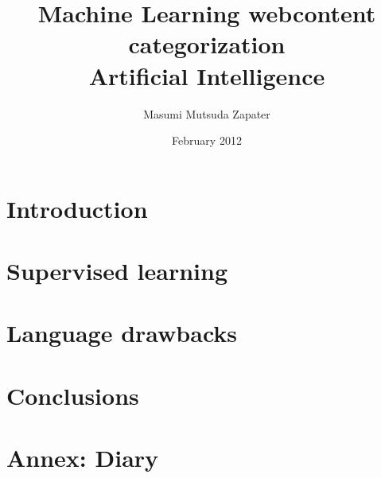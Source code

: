 \documentclass[a4paper , titlepage]{report}
\author{Masumi Mutsuda Zapater}
\title{Machine Learning webcontent categorization \\ Artificial Intelligence}
\date{February 2012}
\begin{document}
\maketitle



\tableofcontents


\chapter{Introduction}


\chapter{Supervised learning}


\chapter{Language drawbacks}


\chapter{Conclusions}
%



\chapter{Annex: Diary }

\end{document}
